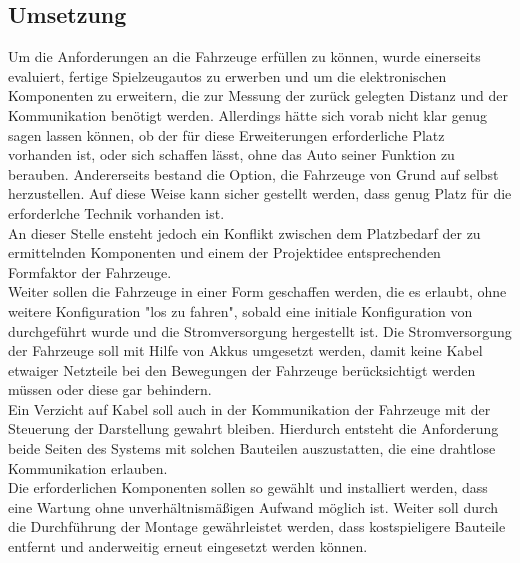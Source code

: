 \documentclass[.../Dokumentation.tex]{subfiles}
\begin{document}
\subsection{Umsetzung}\label{sec-concept-execution}
Um die Anforderungen an die Fahrzeuge erfüllen zu können, wurde 
einerseits evaluiert, fertige Spielzeugautos zu erwerben und um die 
elektronischen Komponenten zu erweitern, die zur Messung der zurück gelegten 
Distanz und der Kommunikation benötigt werden. Allerdings hätte sich vorab 
nicht klar genug sagen lassen können, ob der für diese Erweiterungen 
erforderliche Platz vorhanden ist, oder sich schaffen lässt, ohne das Auto 
seiner Funktion zu berauben. 
Andererseits bestand die Option, die Fahrzeuge von 
Grund auf selbst herzustellen. 
Auf diese Weise kann sicher gestellt werden, 
dass genug Platz für die erforderlche Technik vorhanden ist.\\
An dieser Stelle ensteht jedoch ein Konflikt zwischen dem Platzbedarf der zu 
ermittelnden Komponenten und 
einem der Projektidee entsprechenden Formfaktor der Fahrzeuge.\\
Weiter sollen die Fahrzeuge in einer Form geschaffen werden, die es erlaubt, 
ohne weitere Konfiguration "los zu fahren", sobald eine initiale Konfiguration 
von durchgeführt wurde und die Stromversorgung hergestellt ist. 
Die Stromversorgung der Fahrzeuge soll mit Hilfe von Akkus umgesetzt werden, 
damit keine Kabel etwaiger Netzteile bei den Bewegungen der Fahrzeuge 
berücksichtigt werden müssen oder diese gar behindern.\\
Ein Verzicht auf Kabel soll auch in der Kommunikation der Fahrzeuge mit 
der Steuerung der Darstellung gewahrt bleiben.
Hierdurch entsteht die Anforderung beide Seiten des Systems mit solchen 
Bauteilen auszustatten, die eine drahtlose Kommunikation erlauben.\\
Die erforderlichen Komponenten sollen so gewählt und installiert werden, 
dass eine Wartung ohne unverhältnismäßigen Aufwand möglich ist. Weiter soll 
durch die Durchführung der Montage gewährleistet werden, dass kostspieligere 
Bauteile entfernt und anderweitig erneut eingesetzt werden können.
\end{document}
